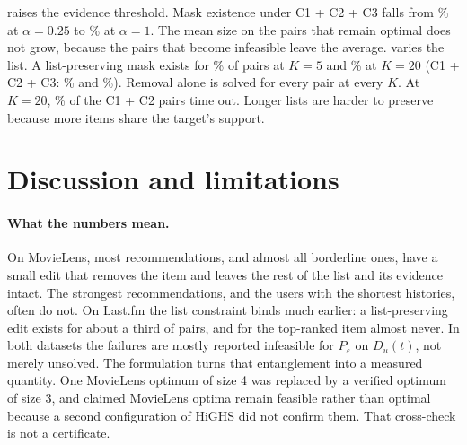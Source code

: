 \documentclass[11pt]{article}
\begin{document}
\begin{table}[t]
\centering
\caption{List size $K$ on a separate MovieLens sample (100 users, every top-$K$ item). Outcomes are percentages.
The $K=10$ row is not the main sample.}
\label{tab:K}

\end{table}

 raises the evidence threshold. Mask existence under C1 + C2 + C3 falls from \AlphaExistsLow\% at
$\alpha=0.25$ to \AlphaExistsOne\% at $\alpha=1$. The mean size on the pairs that remain optimal does not grow,
because the pairs that become infeasible leave the average.  varies the list. A list-preserving mask
exists for \KFiveBExists\% of pairs at $K=5$ and \KTwentyBExists\% at $K=20$ (C1 + C2 + C3: \KFiveCExists\% and
\KTwentyCExists\%). Removal alone is solved for every pair at every $K$. At $K=20$, \KTwentyBTout\% of the C1 + C2 pairs
time out. Longer lists are harder to preserve because more items share the target's support.

\section{Discussion and limitations}

\paragraph{What the numbers mean.} On MovieLens, most recommendations, and almost all borderline ones, have a small
edit that removes the item and leaves the rest of the list and its evidence intact. The strongest recommendations,
and the users with the shortest histories, often do not. On Last.fm the list constraint binds much earlier: a
list-preserving edit exists for about a third of pairs, and for the top-ranked item almost never. In both datasets
the failures are mostly reported infeasible for $P_\varepsilon$ on $D_u(t)$, not merely unsolved. The formulation turns that entanglement into a measured
quantity. One MovieLens optimum of size 4 was replaced by a verified optimum of size 3, and \MLCertUndecided{}
claimed MovieLens optima remain feasible rather than optimal because a second configuration of HiGHS did not
confirm them. That cross-check is not a certificate.
\end{document}
